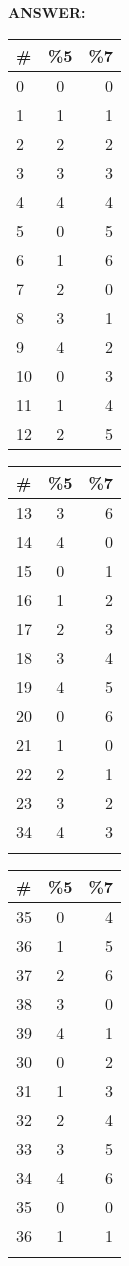 \documentclass{article}
\begin{document}
{\bfseries ANSWER: }\\
\begin {tabular}{l || c | r}
\# & \%5 & \%7 \\ \hline
0 & 0 & 0 \\ \hline
1 & 1 & 1 \\ \hline
2 & 2 & 2 \\ \hline
3 & 3 & 3 \\ \hline
4 & 4 & 4 \\ \hline
5 & 0 & 5 \\ \hline
6 & 1 & 6 \\ \hline
7 & 2 & 0 \\ \hline
8 & 3 & 1 \\ \hline
9 & 4 & 2 \\ \hline
10 & 0 & 3 \\ \hline
11 & 1 & 4 \\ \hline
12 & 2 & 5 \\ \hline
\end{tabular}
\hspace{0.2in}
\begin{tabular}{l || c | r}
\# & \%5 & \%7 \\ \hline
13 & 3 & 6 \\ \hline
14 & 4 & 0 \\ \hline
15 & 0 & 1 \\ \hline
16 & 1 & 2 \\ \hline
17 & 2 & 3 \\ \hline
18 & 3 & 4 \\ \hline
19 & 4 & 5 \\ \hline
20 & 0 & 6 \\ \hline
21 & 1 & 0 \\ \hline
22 & 2 & 1 \\ \hline
23 & 3 & 2 \\ \hline
34 & 4 & 3 \\ \hline
\\
\end{tabular}
\hspace{0.2in}
\begin{tabular}{l || c | r}
\# & \%5 & \%7 \\ \hline
35 & 0 & 4 \\ \hline
36 & 1 & 5 \\ \hline
37 & 2 & 6 \\ \hline
38 & 3 & 0 \\ \hline
39 & 4 & 1 \\ \hline
30 & 0 & 2 \\ \hline
31 & 1 & 3 \\ \hline
32 & 2 & 4 \\ \hline
33 & 3 & 5 \\ \hline
34 & 4 & 6 \\ \hline
35 & 0 & 0 \\ \hline
36 & 1 & 1 \\ \hline
\\
\end{tabular}
\end{document}
